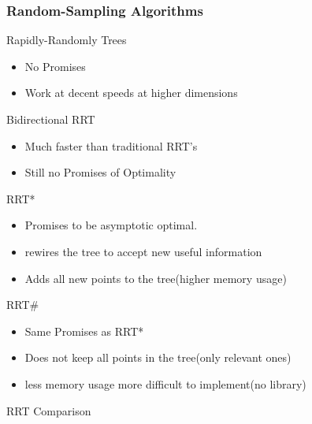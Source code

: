 \documentclass[pdf]{beamer}
\begin{document}
\subsubsection{Random-Sampling Algorithms}
\begin{frame}{Rapidly-Randomly Trees}
  \begin{itemize}
  \item No Promises
  \item Work at decent speeds at higher dimensions
  \end{itemize}
\end{frame}

\begin{frame}{Bidirectional RRT}
  \begin{itemize}
  \item Much faster than traditional RRT's
  \item Still no Promises of Optimality
  \end{itemize}
\end{frame}

\begin{frame}{RRT*}
  \begin{itemize}
  \item Promises to be asymptotic optimal.
  \item rewires the tree to accept new useful information
  \item Adds all new points to the tree(higher memory usage)
  \end{itemize}
\end{frame}

\begin{frame}{RRT\#}
  \begin{itemize}
  \item Same Promises as RRT*
  \item Does not keep all points in the tree(only relevant ones)
  \item less memory usage more difficult to implement(no library)
  \end{itemize}
\end{frame}

\begin{frame}{RRT Comparison}
\end{frame}
\end{document}
